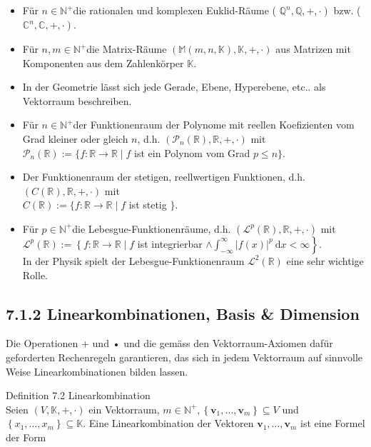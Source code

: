 \documentclass[10pt]{article}
\begin{document}
\begin{itemize}
  \item Für $n \in \mathbb{N}^{+}$die rationalen und komplexen Euklid-Räume ( $\left.\mathbb{Q}^{n}, \mathbb{Q},+, \cdot\right)$ bzw. ( $\left.\mathbb{C}^{n}, \mathbb{C},+, \cdot\right)$.
  \item Für $n, m \in \mathbb{N}^{+}$die Matrix-Räume $(\mathbb{M}(m, n, \mathbb{K}), \mathbb{K},+, \cdot)$ aus Matrizen mit Komponenten aus dem Zahlenkörper $\mathbb{K}$.
  \item In der Geometrie lässt sich jede Gerade, Ebene, Hyperebene, etc.. als Vektorraum beschreiben.
  \item Für $n \in \mathbb{N}^{+}$der Funktionenraum der Polynome mit reellen Koefizienten vom Grad kleiner oder gleich $n$, d.h. $\left(\mathcal{P}_{n}(\mathbb{R}), \mathbb{R},+, \cdot\right)$ mit\\
$\mathcal{P}_{n}(\mathbb{R}):=\{f: \mathbb{R} \rightarrow \mathbb{R} \mid f$ ist ein Polynom vom Grad $p \leq n\}$.
  \item Der Funktionenraum der stetigen, reellwertigen Funktionen, d.h. $(C(\mathbb{R}), \mathbb{R},+, \cdot)$ mit\\
$C(\mathbb{R}):=\{f: \mathbb{R} \rightarrow \mathbb{R} \mid f$ ist stetig $\}$.
  \item Für $p \in \mathbb{N}^{+}$die Lebesgue-Funktionenräume, d.h. $\left(\mathcal{L}^{p}(\mathbb{R}), \mathbb{R},+, \cdot\right)$ mit\\
$\mathcal{L}^{p}(\mathbb{R}):=\left\{f: \mathbb{R} \rightarrow \mathbb{R} \mid f\right.$ ist integrierbar $\left.\wedge \int_{-\infty}^{\infty}|f(x)|^{p} \mathrm{~d} x<\infty\right\}$.\\
In der Physik spielt der Lebesgue-Funktionenraum $\mathcal{L}^{2}(\mathbb{R})$ eine sehr wichtige Rolle.
\end{itemize}

\subsection*{7.1.2 Linearkombinationen, Basis \& Dimension}
Die Operationen + und • und die gemäss den Vektorraum-Axiomen dafür geforderten Rechenregeln garantieren, das sich in jedem Vektorraum auf sinnvolle Weise Linearkombinationen bilden lassen.

Definition 7.2 Linearkombination\\
Seien $(V, \mathbb{K},+, \cdot)$ ein Vektorraum, $m \in \mathbb{N}^{+},\left\{\mathbf{v}_{1}, \ldots, \mathbf{v}_{m}\right\} \subseteq V$ und $\left\{x_{1}, \ldots, x_{m}\right\} \subseteq \mathbb{K}$. Eine Linearkombination der Vektoren $\mathbf{v}_{1}, \ldots, \mathbf{v}_{m}$ ist eine Formel der Form
\end{document}
